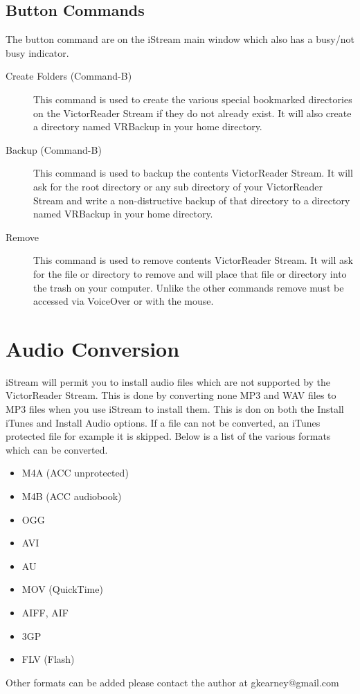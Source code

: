 \documentclass[12pt]{article}
\begin{document}
\subsection{Button Commands}
The button command are on the iStream main window which also has a busy/not busy indicator.
\begin{description}
\item[ Create Folders (Command-B)] This command is used to create the various special bookmarked directories on the VictorReader Stream if they do not already exist. It will also create a directory named VRBackup in your home directory.
\item[ Backup (Command-B)] This command is used to backup the contents VictorReader Stream. It will ask for the root directory or any sub directory of your VictorReader Stream and write a non-distructive backup of that directory to a directory named VRBackup in your home directory.
\item[ Remove] This command is used to remove contents VictorReader Stream. It will ask for the file or directory to remove and will place that file or directory into the trash on your computer. Unlike the other commands remove must be accessed via VoiceOver or with the mouse.
\end{description}
\section{Audio Conversion}
iStream will permit you to install audio files which are not supported by the VictorReader Stream. This is done by converting none MP3 and WAV files to MP3 files when you use iStream to install them. This is don on both the Install iTunes and Install Audio options.  If a file can not be converted, an iTunes protected file for example it is skipped. Below is a list of the various formats which can be converted.

\begin{itemize}
\item M4A (ACC unprotected)
\item M4B (ACC audiobook)
\item OGG
\item AVI
\item AU
\item MOV (QuickTime)
\item AIFF, AIF
\item 3GP
\item FLV (Flash)
\end{itemize}

Other formats can be added please contact the author at gkearney@gmail.com
\end{document}
